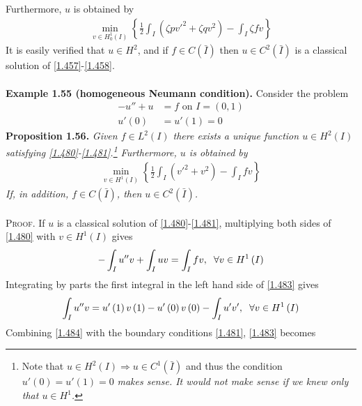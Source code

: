 \documentclass[a4paper,oneside]{article}
\numberwithin{equation}{section}
\begin{document}
Furthermore, $u$ is obtained by
\begin{align}
\mathop {\min }\limits_{v \in H_0^1\left( I \right)} \left\{ {\frac{1}{2}\int_I {\left( {\zeta pv{'^2} + \zeta q{v^2}} \right)}  - \int_I {\zeta fv} } \right\}
\end{align}
It is easily verified that $u\in H^2$, and if $f\in C\left(\bar I\right)$ then $u\in C^2\left(\bar I\right)$ is a classical solution of \eqref{1.457}-\eqref{1.458}.\\
\\
\textbf{Example 1.55 (homogeneous Neumann condition).} Consider the problem
\begin{align}
\label{1.480}
 - u'' + u &= f\mbox{ on } I = \left( {0,1} \right)\\
u'\left( 0 \right)& = u'\left( 1 \right) = 0 \label{1.481}
\end{align}
\textbf{Proposition 1.56.} \textit{Given $f\in L^2\left(I\right)$ there exists a unique function $u\in H^2\left(I\right)$ satisfying \eqref{1.480}-\eqref{1.481}.\footnote{Note that $u \in {H^2}\left( I \right) \Rightarrow u \in {C^1}\left( {\bar I} \right)$ and thus the condition $u'\left(0\right)=u'\left(1\right)=0$ \textit{makes sense. It would not make sense if we knew only that $u\in H^1$.}} Furthermore, $u$ is obtained by}
\begin{align}
\mathop {\min }\limits_{v \in {H^1}\left( I \right)} \left\{ {\frac{1}{2}\int_I {\left( {v{'^2} + {v^2}} \right)}  - \int_I {fv} } \right\}
\end{align}
\textit{If, in addition, $f\in C\left(\bar I\right)$, then $u\in C^2\left(\bar I\right)$.}\\
\\
\textsc{Proof.} If $u$ is a classical solution of \eqref{1.480}-\eqref{1.481}, multiplying both sides of \eqref{1.480} with $v\in H^1\left(I\right)$ gives
\begin{align}
\label{1.483}
 - \int_I {u''v}  + \int_I {uv}  = \int_I {fv} ,\hspace{0.2cm}\forall v \in {H^1}\left( I \right)
\end{align}
Integrating by parts the first integral in the left hand side of \eqref{1.483} gives
\begin{align}
\label{1.484}
\int_I {u''v}  = u'\left( 1 \right)v\left( 1 \right) - u'\left( 0 \right)v\left( 0 \right) - \int_I {u'v'} ,\hspace{0.2cm}\forall v \in {H^1}\left( I \right)
\end{align}
Combining \eqref{1.484} with the boundary conditions \eqref{1.481}, \eqref{1.483} becomes
\end{document}
